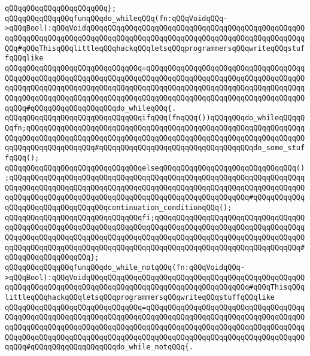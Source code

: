 \verb|qQQqqQQqqQQqqQQqqQQqqQQq};|\newline
\newline
\verb|qQQqqQQqqQQqqQQqfunqQQqdo_whileqQQq(fn:qQQqVoidqQQq->qQQqBool):qQQqVoidqQQqqQQqqQQqqQQqqQQqqQQqqQQqqQQqqQQqqQQqqQQqqQQqqQQqqQQqqQQqqQQqqQQqqQQqqQQqqQQqqQQqqQQqqQQqqQQqqQQqqQQqqQQqqQQqqQQqqQQqqQQq#qQQqThisqQQqlittleqQQqhackqQQqletsqQQqprogrammersqQQqwriteqQQqstuffqQQqlike|\newline
\verb|qQQqqQQqqQQqqQQqqQQqqQQqqQQqqQQq=qQQqqQQqqQQqqQQqqQQqqQQqqQQqqQQqqQQqqQQqqQQqqQQqqQQqqQQqqQQqqQQqqQQqqQQqqQQqqQQqqQQqqQQqqQQqqQQqqQQqqQQqqQQqqQQqqQQqqQQqqQQqqQQqqQQqqQQqqQQqqQQqqQQqqQQqqQQqqQQqqQQqqQQqqQQqqQQqqQQqqQQqqQQqqQQqqQQqqQQqqQQqqQQqqQQqqQQqqQQqqQQqqQQqqQQqqQQqqQQqqQQqqQQqqQQq#qQQqqQQqqQQqqQQqqQQqdo_whileqQQq{.|\newline
\verb|qQQqqQQqqQQqqQQqqQQqqQQqqQQqqQQqifqQQq(fnqQQq())qQQqqQQqdo_whileqQQqqQQqfn;qQQqqQQqqQQqqQQqqQQqqQQqqQQqqQQqqQQqqQQqqQQqqQQqqQQqqQQqqQQqqQQqqQQqqQQqqQQqqQQqqQQqqQQqqQQqqQQqqQQqqQQqqQQqqQQqqQQqqQQqqQQqqQQqqQQqqQQqqQQqqQQqqQQqqQQqqQQq#qQQqqQQqqQQqqQQqqQQqqQQqqQQqqQQqqQQqdo_some_stuffqQQq();|\newline
\verb|qQQqqQQqqQQqqQQqqQQqqQQqqQQqqQQqelseqQQqqQQqqQQqqQQqqQQqqQQqqQQqqQQq();qQQqqQQqqQQqqQQqqQQqqQQqqQQqqQQqqQQqqQQqqQQqqQQqqQQqqQQqqQQqqQQqqQQqqQQqqQQqqQQqqQQqqQQqqQQqqQQqqQQqqQQqqQQqqQQqqQQqqQQqqQQqqQQqqQQqqQQqqQQqqQQqqQQqqQQqqQQqqQQqqQQqqQQqqQQqqQQqqQQqqQQqqQQqqQQqqQQq#qQQqqQQqqQQqqQQqqQQqqQQqqQQqqQQqqQQqcontinuation_conditionqQQq();|\newline
\verb|qQQqqQQqqQQqqQQqqQQqqQQqqQQqqQQqfi;qQQqqQQqqQQqqQQqqQQqqQQqqQQqqQQqqQQqqQQqqQQqqQQqqQQqqQQqqQQqqQQqqQQqqQQqqQQqqQQqqQQqqQQqqQQqqQQqqQQqqQQqqQQqqQQqqQQqqQQqqQQqqQQqqQQqqQQqqQQqqQQqqQQqqQQqqQQqqQQqqQQqqQQqqQQqqQQqqQQqqQQqqQQqqQQqqQQqqQQqqQQqqQQqqQQqqQQqqQQqqQQqqQQqqQQqqQQqqQQqqQQq#qQQqqQQqqQQqqQQqqQQq};|\newline
\newline
\verb|qQQqqQQqqQQqqQQqfunqQQqdo_while_notqQQq(fn:qQQqVoidqQQq->qQQqBool):qQQqVoidqQQqqQQqqQQqqQQqqQQqqQQqqQQqqQQqqQQqqQQqqQQqqQQqqQQqqQQqqQQqqQQqqQQqqQQqqQQqqQQqqQQqqQQqqQQqqQQqqQQqqQQqqQQq#qQQqThisqQQqlittleqQQqhackqQQqletsqQQqprogrammersqQQqwriteqQQqstuffqQQqlike|\newline
\verb|qQQqqQQqqQQqqQQqqQQqqQQqqQQqqQQq=qQQqqQQqqQQqqQQqqQQqqQQqqQQqqQQqqQQqqQQqqQQqqQQqqQQqqQQqqQQqqQQqqQQqqQQqqQQqqQQqqQQqqQQqqQQqqQQqqQQqqQQqqQQqqQQqqQQqqQQqqQQqqQQqqQQqqQQqqQQqqQQqqQQqqQQqqQQqqQQqqQQqqQQqqQQqqQQqqQQqqQQqqQQqqQQqqQQqqQQqqQQqqQQqqQQqqQQqqQQqqQQqqQQqqQQqqQQqqQQqqQQqqQQqqQQq#qQQqqQQqqQQqqQQqqQQqdo_while_notqQQq{.|\newline
